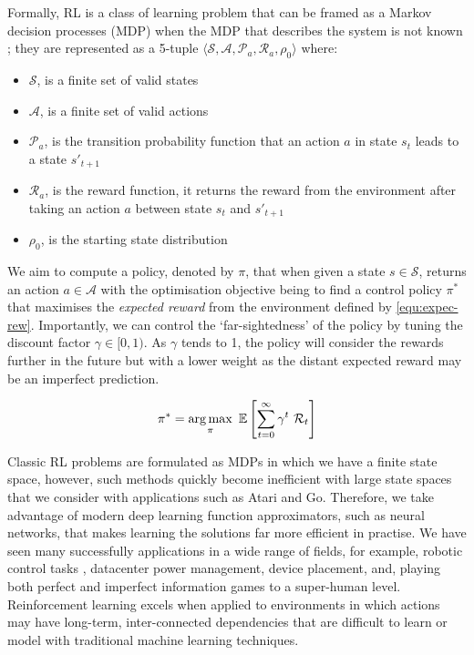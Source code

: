 Formally, RL is a class of learning problem that can be framed as a Markov decision processes (MDP) when the MDP that describes the system is not known \cite{bellman1957}; they are represented as a 5-tuple $\langle \mathcal{S}, \mathcal{A}, \mathcal{P}_a, \mathcal{R}_a, \rho_0 \rangle$ where:

\begin{itemize}
  \item $\mathcal{S}$, is a finite set of valid states
  \item $\mathcal{A}$, is a finite set of valid actions
  \item $\mathcal{P}_a$, is the transition probability function that an action $a$ in state $s_t$ leads to a state $s'_{t+1}$
  \item $\mathcal{R}_a$, is the reward function, it returns the reward from the environment after taking an action $a$ between state $s_t$ and $s'_{t+1}$
  \item $\rho_0$, is the starting state distribution
\end{itemize}

We aim to compute a policy, denoted by $\pi$, that when given a state $s \in \mathcal{S}$, returns an action $a \in \mathcal{A}$ with the optimisation objective being to find a control policy $\pi^*$ that maximises the \textit{expected reward} from the environment defined by \ref{equ:expec-rew}. Importantly, we can control the `far-sightedness' of the policy by tuning the discount factor $\gamma \in [0, 1)$. As $\gamma$ tends to 1, the policy will consider the rewards further in the future but with a lower weight as the distant expected reward may be an imperfect prediction.

\begin{equation}
  \label{equ:expec-rew}
  \pi^* = \operatorname*{arg\,max}_\pi~\mathbb{E} \left[ \sum^\infty_{t=0} \gamma^t~\mathcal{R}_t \right]
\end{equation}

Classic RL problems are formulated as MDPs in which we have a finite state space, however, such methods quickly become inefficient with large state spaces that we consider with applications such as Atari and Go. Therefore, we take advantage of modern deep learning function approximators, such as neural networks, that makes learning the solutions far more efficient in practise. We have seen many successfully applications in a wide range of fields, for example, robotic control tasks \cite{openai2019solving}, datacenter power management, device placement, and, playing both perfect and imperfect information games to a super-human level. Reinforcement learning excels when applied to environments in which actions may have long-term, inter-connected dependencies that are difficult to learn or model with traditional machine learning techniques.

